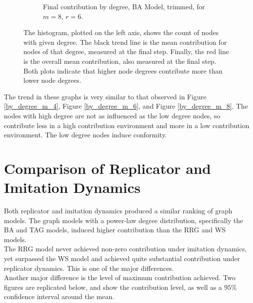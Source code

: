 \begin{figure}[!h]
\begin{subfigure}[b]{0.45\textwidth}
    \caption{Final contribution by degree, BA Model, trimmed, for $m=8$, $r=6$. }
    \label{ID_by_degree_m_8_phi_6}
  \end{subfigure}
  \caption{The histogram, plotted on the left axis, shows the count of nodes with given degree. The black trend line is the mean contribution for nodes of that degree, measured at the final step. Finally, the red line is the overall mean contribution, also measured at the final step. Both plots indicate that higher node degrees contribute more than lower node degrees.} \label{ID_by_degree_m_8}
\end{figure} 
\FloatBarrier

The trend in these graphs is very similar to that observed in Figure \ref{by_degree_m_4}, Figure \ref{by_degree_m_6}, and Figure \ref{by_degree_m_8}. The nodes with high degree are not as influenced as the low degree nodes, so contribute less in a high contribution environment and more in a low contribution environment. The low degree nodes induce conformity.

\section{Comparison of Replicator and Imitation Dynamics}

Both replicator and imitation dynamics produced a similar ranking of graph models. The graph models with a power-law degree distribution, specifically the BA and TAG models, induced higher contribution than the RRG and WS models. \\

The RRG model never achieved non-zero contribution under imitation dynamics, yet surpassed the WS model and achieved quite substantial contribution under replicator dynamics. This is one of the major differences. \\

Another major difference is the level of maximum contribution achieved. Two figures are replicated below, and show the contribution level, as well as a $95\%$ confidence interval around the mean. \\

